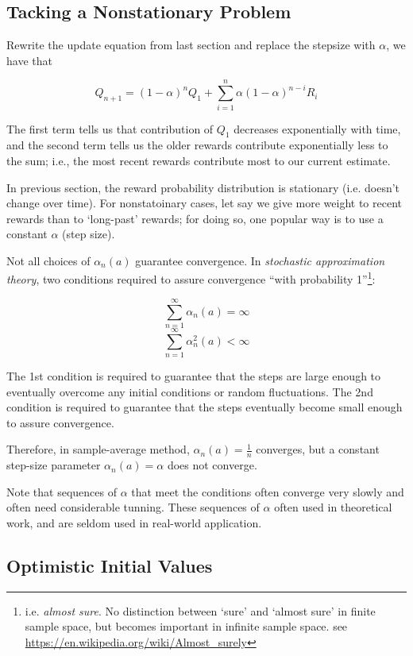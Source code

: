 \documentclass[sutton_barto_notes.tex]{subfiles}
\begin{document}
\subsection{Tacking a Nonstationary Problem}

Rewrite the update equation from last section and replace the stepsize with $\alpha$, we have that

$$ Q_{n+1} = (1-\alpha)^n Q_1 + \sum_{i=1}^n \alpha (1-\alpha)^{n-i} R_i$$

The first term tells us that contribution of $Q_1$ decreases exponentially with time, and the second term tells us the older rewards contribute exponentially less to the sum; i.e., the most recent rewards contribute most to our current estimate.

In previous section, the reward probability distribution is stationary (i.e. doesn't change over time).
For nonstatoinary cases, let say we give more weight to recent rewards than to `long-past' rewards; for doing so, one popular way is to use a constant $\alpha$ (step size).

Not all choices of $\alpha_n(a)$ guarantee convergence.
In \textit{stochastic approximation theory}, two conditions required to assure convergence ``with probability 1''\footnote{i.e. \textit{almost sure}. No distinction between `sure' and `almost sure' in finite sample space, but becomes important in infinite sample space. see \url{https://en.wikipedia.org/wiki/Almost_surely}}:

$$ \sum_{n=1}^\infty \alpha_n(a) = \infty $$
$$ \sum_{n=1}^\infty \alpha_n^2(a) < \infty $$

The 1st condition is required to guarantee that the steps are large enough to eventually overcome any initial conditions or random fluctuations.
The 2nd condition is required to guarantee that the steps eventually become small enough to assure convergence.

Therefore, in sample-average method, $\alpha_n(a) = \frac{1}{n}$ converges, but a constant step-size parameter $\alpha_n(a)=\alpha$ does not converge.

Note that sequences of $\alpha$ that meet the conditions often converge very slowly and often need considerable tunning.
These sequences of $\alpha$ often used in theoretical work, and are seldom used in real-world application.

\subsection{Optimistic Initial Values}
\end{document}
